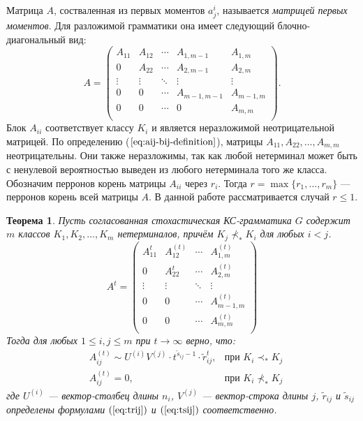 \documentclass[10pt]{article}
\renewcommand{\leq}{\leqslant}
\newtheorem{theorem}{Теорема}
\begin{document}
Матрица $A$, состваленная из первых моментов $a^i_j$, называется \textit{матрицей первых моментов}. Для разложимой грамматики она имеет следующий блочно-диагональный вид:
\begin{equation}
\label{eq:amatrix}
	A =
	\begin{pmatrix}
		A_{11} & A_{12} & \cdots & A_{1,m-1}   & A_{1,m}    \\
		0      & A_{22} & \cdots & A_{2,m-1}   & A_{2,m}    \\ 
		\vdots & \vdots & \ddots & \vdots      & \vdots     \\
		0      & 0      & \cdots & A_{m-1,m-1} & A_{m-1, m} \\
		0      & 0      & \cdots & 0           & A_{m,m}    \\
	\end{pmatrix}.
\end{equation}
Блок $A_{ii}$ соответствует классу $K_i$ и является неразложимой неотрицательной матрицей. По определению ($\ref{eq:aij-bij-definition}$), матрицы $A_{11}, A_{22}, \ldots, A_{m,m}$ неотрицательны. Они также неразложимы, так как любой нетерминал может быть с ненулевой вероятностью выведен из любого нетерминала того же класса. Обозначим перронов корень \cite{gantmaher-matrix-theory} матрицы $A_{ii}$ через $r_i$. Тогда $r = \max\{r_1, \ldots, r_m\}$ --- перронов корень всей матрицы $A$. В данной работе рассматривается случай $r \leq 1$.

\begin{theorem}
\label{t:at}
Пусть согласованная стохастическая КС-грамматика $G$ содержит $m$ классов $K_1, K_2, \ldots, K_m$ нетерминалов, причём $K_j \nprec_* K_i$ для любых $i < j$.
\begin{equation*}
	A^t =
	\begin{pmatrix}
		A_{11}^t & A_{12}^{(t)} & \cdots & A_{1,m}^{(t)}    \\
		0        & A_{22}^t     & \cdots & A_{2,m}^{(t)}    \\ 
		\vdots   & \vdots       & \ddots & \vdots           \\
		0        & 0            & \cdots & A_{m-1, m}^{(t)} \\
		0        & 0            & \cdots & A_{m,m}^{(t)}    \\
	\end{pmatrix}
\end{equation*}
Тогда для любых $1 \leq i, j \leq m$ при $t \rightarrow \infty$ верно, что:
\begin{align*}
    & A_{ij}^{(t)} \sim U^{(i)} V^{(j)} \cdot t^{\tilde{s}_{ij} - 1} \cdot \tilde{r}_{ij}^t, & \text{при } K_i \prec_* K_j \\
    & A_{ij}^{(t)} = 0, & \text{при } K_i \nprec_* K_j
\end{align*}
где $U^{(i)}$ --- вектор-столбец длины $n_i$, $V^{(j)}$ --- вектор-строка длины $j$, $\tilde{r}_{ij}$ и $\tilde{s}_{ij}$ определены формулами $(\ref{eq:trij})$ и $(\ref{eq:tsij})$ соответственно.
\end{theorem}
\end{document}
